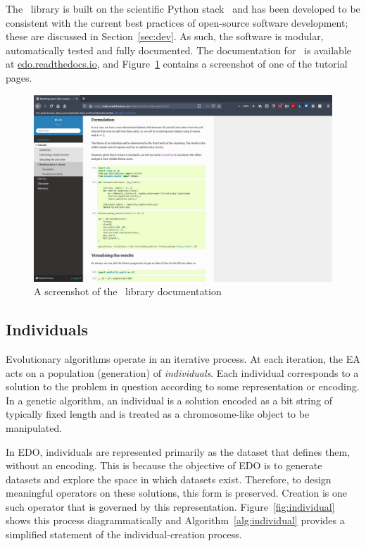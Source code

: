 The \edo\ library is built on the scientific Python stack~\cite{pandas,numpy}
and has been developed to be consistent with the current best practices of
open-source software development; these are discussed in
Section~\ref{sec:dev}. As such, the software is modular, automatically tested
and fully documented. The documentation for \edo\ is available at
\url{edo.readthedocs.io}, and Figure~\ref{fig:docs} contains a screenshot of one
of the tutorial pages.

\graphicspath{{./}}
\begin{figure}[htbp]
    \centering
    \includegraphics[width=\imgwidth]{img/docs.png}
    \caption{A screenshot of the \edo\ library documentation}
    \label{fig:docs}
\end{figure}
\graphicspath{{chapters/edo/paper/img/}}


\subsection{Individuals}

Evolutionary algorithms operate in an iterative process. At each iteration, the
EA acts on a population (generation) of \emph{individuals}. Each individual
corresponds to a solution to the problem in question according to some
representation or encoding. In a genetic algorithm, an individual is a solution
encoded as a bit string of typically fixed length and is treated as a
chromosome-like object to be manipulated.

In EDO, individuals are represented primarily as the dataset that defines them,
without an encoding. This is because the objective of EDO is to generate
datasets and explore the space in which datasets exist. Therefore, to design
meaningful operators on these solutions, this form is preserved. Creation is one
such operator that is governed by this representation.
Figure~\ref{fig:individual} shows this process diagrammatically and
Algorithm~\ref{alg:individual} provides a simplified statement of the
individual-creation process.

